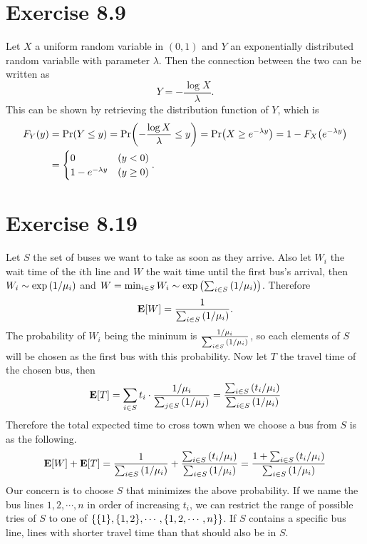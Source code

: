 \documentclass{article}
\begin{document}
\section*{Exercise 8.9}
Let $X$ a uniform random variable in $(0, 1)$ and $Y$ an exponentially distributed random variablle with parameter $\lambda$. 
Then the connection between the two can be written as
$$Y = -\frac{\log{X}}{\lambda}.$$
This can be shown by retrieving the distribution function of $Y$, which is
\begin{align*}
    F_{Y}(y) &= \mathrm{Pr}\qty(Y \leq y) = \mathrm{Pr}\qty(-\frac{\log{X}}{\lambda} \leq y) = \mathrm{Pr}\qty(X \geq e^{-\lambda y}) = 1 - F_X\qty(e^{-\lambda y}) \\
    &= \begin{cases}
        0 & (y < 0) \\
        1 - e^{-\lambda y} & (y \geq 0)
    \end{cases}. 
\end{align*}

\section*{Exercise 8.19}
Let $S$ the set of buses we want to take as soon as they arrive.
Also let $W_i$ the wait time of the $i$th line and $W$ the wait time until the first bus's arrival, then $W_i \sim \exp\qty({1}/{\mu_i})$ and $W = \min_{i \in S}{W_i} \sim \exp\qty(\sum_{i \in S}\qty(1/\mu_i))$.
Therefore
$$\mathbf{E}\qty[W] = \frac{1}{\sum_{i \in S}\qty(1/\mu_i)}.$$
The probability of $W_i$ being the mininum is $\frac{1/\mu_i}{\sum_{i \in S}\qty(1/\mu_i)}$, so each elements of $S$ will be chosen as the first bus with this probability. 
Now let $T$ the travel time of the chosen bus, then 
$$\mathbf{E}\qty[T] = \sum_{i \in S}t_i \cdot \frac{1/\mu_i}{\sum_{j \in S}\qty(1/\mu_j)} = \frac{\sum_{i \in S}\qty(t_i/\mu_i)}{\sum_{i \in S}\qty(1/\mu_i)}$$
Therefore the total expected time to cross town when we choose a bus from $S$ is as the following.
$$\mathbf{E}\qty[W] + \mathbf{E}\qty[T] = \frac{1}{\sum_{i \in S}\qty(1/\mu_i)} + \frac{\sum_{i \in S}\qty(t_i/\mu_i)}{\sum_{i \in S}\qty(1/\mu_i)} = \frac{1 + \sum_{i \in S}\qty(t_i/\mu_i)}{\sum_{i \in S}\qty(1/\mu_i)}$$
Our concern is to choose $S$ that minimizes the above probability.
If we name the bus lines $1, 2, \cdots, n$ in order of increasing $t_i$, we can restrict the range of possible tries of $S$ to one of $\qty{\qty{1}, \qty{1, 2}, \cdots, \qty{1, 2, \cdots, n}}$.
If $S$ contains a specific bus line, lines with shorter travel time than that should also be in $S$.
\end{document}
